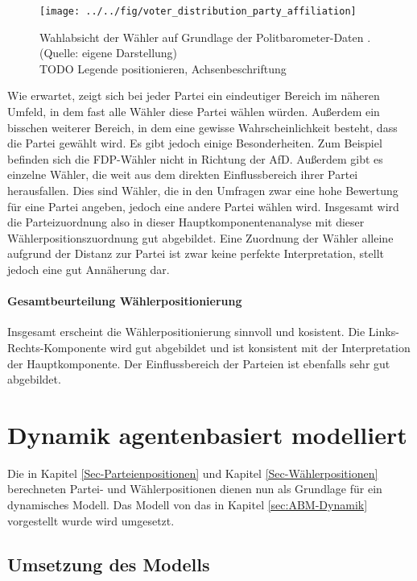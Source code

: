 \begin{figure}[htb]
	\centering
	\texttt{[image: ../../fig/voter\_distribution\_party\_affiliation]}
	\caption{Wahlabsicht der Wähler auf Grundlage der Politbarometer-Daten \citep{politbarometer}. (Quelle: eigene Darstellung)\\TODO Legende positionieren, Achsenbeschriftung}
	\label{fig:voter-positions-pca-party-affiliation}
\end{figure}

Wie erwartet, zeigt sich bei jeder Partei ein eindeutiger Bereich im näheren Umfeld, in dem fast alle Wähler diese Partei wählen würden. Außerdem ein bisschen weiterer Bereich, in dem eine gewisse Wahrscheinlichkeit besteht, dass die Partei gewählt wird. Es gibt jedoch einige Besonderheiten. Zum Beispiel befinden sich die FDP-Wähler nicht in Richtung der AfD. Außerdem gibt es einzelne Wähler, die weit aus dem direkten Einflussbereich ihrer Partei herausfallen. Dies sind Wähler, die in den Umfragen zwar eine hohe Bewertung für eine Partei angeben, jedoch eine andere Partei wählen wird.
Insgesamt wird die Parteizuordnung also in dieser Hauptkomponentenanalyse mit dieser Wählerpositionszuordnung gut abgebildet. Eine Zuordnung der Wähler alleine aufgrund der Distanz zur Partei ist zwar keine perfekte Interpretation, stellt jedoch eine gut Annäherung dar.

\paragraph{Gesamtbeurteilung Wählerpositionierung}
Insgesamt erscheint die Wählerpositionierung sinnvoll und kosistent. Die Links-Rechts-Komponente wird gut abgebildet und ist konsistent mit der Interpretation der Hauptkomponente. Der Einflussbereich der Parteien ist ebenfalls sehr gut abgebildet.

\section{Dynamik agentenbasiert modelliert} \label{Sec:Dynamik-Anwendung}

Die in Kapitel \ref{Sec-Parteienpositionen} und Kapitel \ref{Sec-Wählerpositionen} berechneten Partei- und Wählerpositionen dienen nun als Grundlage für ein dynamisches Modell. Das Modell von \citet{laver2005policy} das in Kapitel \ref{sec:ABM-Dynamik} vorgestellt wurde wird umgesetzt.

\subsection{Umsetzung des Modells}

